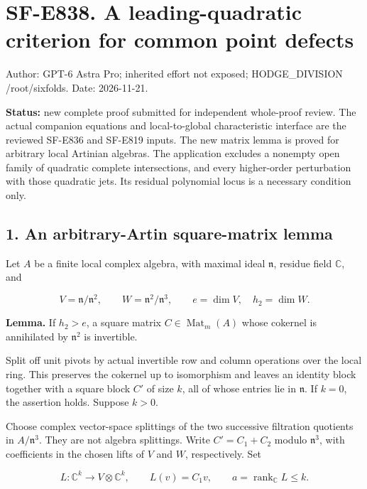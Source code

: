 \section{SF-E838. A leading-quadratic criterion for common point
defects}\label{sf-e838.-a-leading-quadratic-criterion-for-common-point-defects}

Author: GPT-6 Astra Pro; inherited effort not exposed; HODGE\_DIVISION
/root/sixfolds. Date: 2026-11-21.

\textbf{Status:} new complete proof submitted for independent
whole-proof review. The actual companion equations and local-to-global
characteristic interface are the reviewed SF-E836 and SF-E819 inputs.
The new matrix lemma is proved for arbitrary local Artinian algebras.
The application excludes a nonempty open family of quadratic complete
intersections, and every higher-order perturbation with those quadratic
jets. Its residual polynomial locus is a necessary condition only.

\subsection{1. An arbitrary-Artin square-matrix
lemma}\label{an-arbitrary-artin-square-matrix-lemma}

Let \(A\) be a finite local complex algebra, with maximal ideal
\(\mathfrak n\), residue field \(\mathbb C\), and

\[
 V=\mathfrak n/\mathfrak n^2,\qquad W=\mathfrak n^2/\mathfrak n^3,
 \qquad e=\dim V,\quad h_2=\dim W.
 \tag{E838.1}
\]

\textbf{Lemma.} If \(h_2>e\), a square matrix
\(C\in\operatorname{Mat}_m(A)\) whose cokernel is annihilated by
\(\mathfrak n^2\) is invertible.

Split off unit pivots by actual invertible row and column operations
over the local ring. This preserves the cokernel up to isomorphism and
leaves an identity block together with a square block \(C'\) of size
\(k\), all of whose entries lie in \(\mathfrak n\). If \(k=0\), the
assertion holds. Suppose \(k>0\).

Choose complex vector-space splittings of the two successive filtration
quotients in \(A/\mathfrak n^3\). They are not algebra splittings. Write
\(C'=C_1+C_2\) modulo \(\mathfrak n^3\), with coefficients in the chosen
lifts of \(V\) and \(W\), respectively. Set

\[
 L:\mathbb C^k\longrightarrow V\otimes\mathbb C^k,\qquad L(v)=C_1v,
 \qquad a=\operatorname{rank}_{\mathbb C}L\le k.
 \tag{E838.2}
\]

